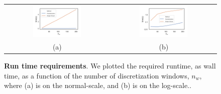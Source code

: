 \documentclass[a4paper]{article}
\begin{document}



\begin{figure}[H]
  \centering
  \begin{tabular}{cc}
  \includegraphics[width=0.48\textwidth]{figures/VarS.png}\label{fig:noarmal04} &  \includegraphics[width=0.48\textwidth]{figures/VarSLog.png}\label{fig:normal12} \\
  (a) & (b)
  \end{tabular}
  \caption{{\bf Run time requirements}. We plotted the required runtime, as wall time, as a function of the number of discretization windows, $n_w$, where (a) is on the normal-scale, and (b) is on the log-scale..\label{fig:runtime3}}
\end{figure}
\end{document}

